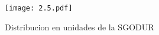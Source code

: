 \begin{figure}[h!]
	\centering
	\texttt{[image: 2.5.pdf]}
	\caption{Distribucion en unidades de la SGODUR}
	\label{fig:2.5}
\end{figure}